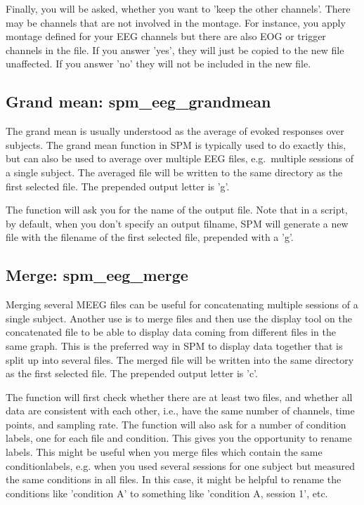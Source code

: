 Finally, you will be asked, whether you want to 'keep the other channels'. There may be channels that are
not involved in the montage. For instance, you apply montage defined for your EEG channels but there are also
EOG or trigger channels in the file. If you answer 'yes', they will just be copied to the new file unaffected.
If you answer 'no' they will not be included in the new file.


\subsection{Grand mean: spm\_eeg\_grandmean}
The grand mean is usually understood as the average of evoked
responses over subjects. The grand mean function in SPM is typically
used to do exactly this, but can also be used to average over multiple 
EEG files, e.g.~multiple sessions of a single subject. The averaged
file will be written to the same directory as the first selected
file. The prepended output letter is 'g'.

The function will ask you for the name of the output file. Note that in a
script, by default, when you don't specify an output filname, 
SPM will generate a new file with the filename of the first selected file, 
prepended with a 'g'.

\subsection{Merge: spm\_eeg\_merge}
Merging several MEEG files can be useful for concatenating multiple
sessions of a single subject. Another use is to merge files and then
use the display tool on the concatenated file to be able to display
data coming from different files in the same graph. This is the
preferred way in SPM to display data together that is split up into
several files. The merged file will be written into the same directory
as the first selected file. The prepended output letter is 'c'.

The function will first check whether there are at least two files,
and whether all data are consistent with each other, i.e., have the 
same number of channels, time points, and sampling rate. The function 
will also ask for a number of condition labels, one for each file and 
condition. This gives you the opportunity to rename labels. This might
be useful when you merge files which contain the same conditionlabels,
e.g. when you used several sessions for one subject but measured the 
same conditions in all files. In this case, it might be helpful to 
rename the conditions like 'condition A' to something like 'condition A, session 1', 
etc.



